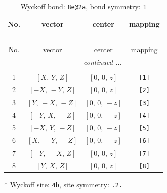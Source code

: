 \documentclass[fleqn,8pt]{jsarticle}
\begin{document}
\renewcommand{\arraystretch}{1.2}
\begin{longtable}{cccc}
\caption{Wyckoff bond: {\tt 8e@2a}, bond symmetry: {\tt 1}}
 \\
 \hline \hline
No. & vector & center & mapping \\ \hline \endfirsthead

\multicolumn{3}{l}{\tablename\ \thetable{}} \\
 \hline \hline
No. & vector & center & mapping \\ \hline \endhead

 \hline \hline
\multicolumn{3}{r}{\footnotesize\it continued ...} \\ \endfoot

 \hline \hline
\multicolumn{3}{r}{} \\ \endlastfoot

1 & $\left[ X,\, Y,\, Z \right]$ & $\left[ 0,\, 0,\, z \right]$ & {\tt [1]} \\ \hline
2 & $\left[ - X,\, - Y,\, Z \right]$ & $\left[ 0,\, 0,\, z \right]$ & {\tt [2]} \\ \hline
3 & $\left[ Y,\, - X,\, - Z \right]$ & $\left[ 0,\, 0,\, - z \right]$ & {\tt [3]} \\ \hline
4 & $\left[ - Y,\, X,\, - Z \right]$ & $\left[ 0,\, 0,\, - z \right]$ & {\tt [4]} \\ \hline
5 & $\left[ - X,\, Y,\, - Z \right]$ & $\left[ 0,\, 0,\, - z \right]$ & {\tt [5]} \\ \hline
6 & $\left[ X,\, - Y,\, - Z \right]$ & $\left[ 0,\, 0,\, - z \right]$ & {\tt [6]} \\ \hline
7 & $\left[ - Y,\, - X,\, Z \right]$ & $\left[ 0,\, 0,\, z \right]$ & {\tt [7]} \\ \hline
8 & $\left[ Y,\, X,\, Z \right]$ & $\left[ 0,\, 0,\, z \right]$ & {\tt [8]} \\
\end{longtable}
* Wyckoff site: {\tt 4b}, site symmetry: {\tt .2.}
\renewcommand{\arraystretch}{1.2}
\end{document}
